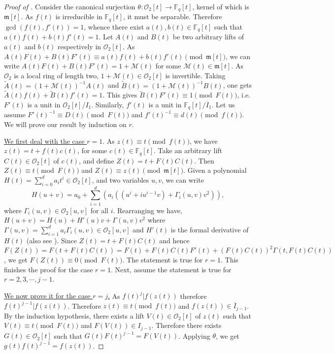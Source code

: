 \documentclass[11pt,twoside]{amsart}
\newcommand{\R}{\mathscr{O}_2}
\newcommand{\Fq}{\mathbb{F}_q}
\theoremstyle{definition} %
\begin{document}
\begin{proof}[Proof of ]
Consider the canonical surjection $\theta:\R[t]\longrightarrow \mathbb{F}_q[t]$, kernel of which is $\mathfrak{m}[t]$.
As $f(t)$ is irreducible in $\Fq[t]$, it must be separable. 
Therefore $\gcd(f(t),f'(t))=1$, whence there exist $a(t),b(t)\in\mathbb{F}_q[t]$ such that $a(t)f(t)+b(t)f'(t)=1$.
Let $A(t)$ and $B(t)$ be two arbitrary lifts of $a(t)$ and $b(t)$ respectively in $\R[t]$. 
As $A(t)F(t)+B(t)F'(t)\equiv a(t)f(t)+b(t)f'(t)\pmod{ \mathfrak{m}[t]}$, we can write $A(t)F(t)+B(t)F'(t)=1+\mathscr{M}(t)$ for some $\mathscr{M}(t)\in \mathfrak{m}[t]$.
As $\R$ is a local ring of length two, $1+\mathscr{M}(t)\in\R[t]$ is invertible. 
Taking $\widetilde{A}(t)=(1+\mathscr{M}(t))^{-1}A(t)$ and $\tilde{B}(t)=(1+\mathscr{M}(t))^{-1}B(t)$, one gets $\tilde{A}(t)f(t)+\tilde{B}(t)f'(t)=1$.
This gives $\tilde{B}(t)F'(t)\equiv1\pmod{F(t)}$,
i.e. $F'(t)$ is a unit in $\R[t]/I_1$.
Similarly, $f'(t)$ is a unit in $\Fq[t]/\overline{I}_1$.
Let us assume $F'(t)^{-1}\equiv D(t)\pmod{F(t)}$ and $f'(t)^{-1}\equiv d(t)\pmod{f(t)}$.
We will prove our result by induction on $r$.

\ul{We first deal with the case $r=1$}.
As $z(t)\equiv t\pmod{f(t)}$, we have $z(t)=t+f(t)c(t)$, for some $c(t)\in\mathbb{F}_q[t]$.
Take an arbitrary lift $C(t)\in\R[t]$ of $c(t)$, and define $Z(t)=t+F(t)C(t)$.
Then $Z(t)\equiv t\pmod{F(t)}$ and $Z(t)\equiv z(t)\pmod{\mathfrak{m}[t]}$.
Given a polynomial $H(t)=\sum_{i=0}^{d}{a_i}t^i\in\R[t]$, and two variables $u,v$, we can write 
$$ H(u+v)= a_0+\sum_{i=1}^{d}{(a_i((u^i+iu^{i-1}v)+\Gamma_i(u,v)v^2))},$$
where $\Gamma_i(u,v)\in\R[u,v]$ for all $i$.
Rearranging we have, $H(u+v)= H(u)+ H'(u)v+\Gamma(u,v)v^2$ where $\Gamma(u,v)=\sum_{i=1}^{d}{a_i\Gamma_i(u,v)}\in\R[u,v]$ and $H'(t)$ is the formal derivative of $H(t)$ (also see \cite[Example 2.2]{ConradHensel}). 
Since $Z(t)=t+F(t)C(t)$ and hence $F(Z(t))=F(t+F(t)C(t))=F(t)+F(t)C(t)F'(t)+(F(t)C(t))^2\Gamma(t,F(t)C(t))$, we get $F(Z(t))\equiv 0\pmod{F(t)}$. The statement is true for $r=1$. {This finishes the proof for the case $r=1$}.
Next, assume the statement is true for $r=2,3,\cdots,j-1$.

\ul{We now prove it for the case $r=j$.} 
As $f(t)^j|f(z(t))$ therefore $f(t)^{j-1}|f(z(t))$. 
Therefore $z(t)\equiv t\pmod{f(t)}$ and $f(z(t))\in \overline{I}_{j-1}$.
By the induction hypothesis, there exists a lift $V(t)\in \R[t]$ of $z(t)$ such that $V(t)\equiv t\pmod{F(t)}$ and $F(V(t))\in I_{j-1}$.
Therefore there exists $G(t)\in \R[t]$ such that $G(t)F(t)^{j-1}=F(V(t))$. 
Applying $\theta$, we get $g(t)f(t)^{j-1}=f(z(t))$.


\end{proof}
\end{document}
